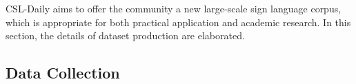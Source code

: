 \documentclass[final]{cvpr}
\begin{document}
\begin{table}[tp]
   \centering
   \footnotesize
   \caption{Key statistics of the CSL-Daily split. 
   (OOV: out-of-vocabulary, \eg, words that occur in Dev set but not in Train set. Singleton: words that only occur once in Train unique sentences.)} \label{tab:csl-daily}
\vspace{-8pt}
\end{table}


CSL-Daily aims to offer the community a new large-scale sign language corpus, 
which is appropriate for both practical application and academic research. 
In this section, the details of dataset production are elaborated. 

\subsection{Data Collection}
\end{document}
